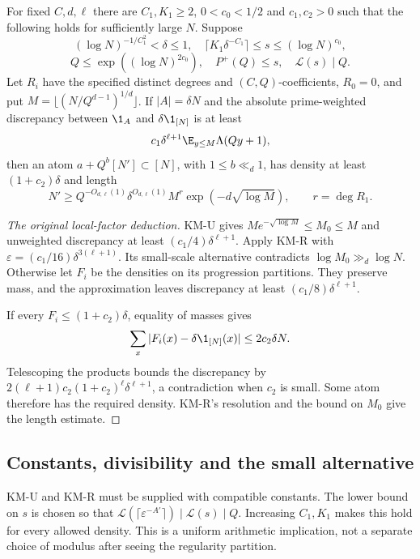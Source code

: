 \begin{proposition}\label{p:KMTT}
For fixed $C,d,\ell$ there are $C_1,K_1\geq2$, $0<c_0<1/2$ and $c_1,c_2>0$ such that the following holds for sufficiently large $N$. Suppose
\[
 (\log N)^{-1/C_1^2}<\delta\leq1,\quad
 \lceil K_1\delta^{-C_1}\rceil\leq s\leq(\log N)^{c_0},
\]
\[
 Q\leq\exp((\log N)^{2c_0}),\quad P^+(Q)\leq s,\quad \mathcal L(s)\mid Q.
\]
Let $R_i$ have the specified distinct degrees and $(C,Q)$-coefficients, $R_0=0$, and put $M=\lfloor(N/Q^{d-1})^{1/d}\rfloor$. If $|A|=\delta N$ and the absolute prime-weighted discrepancy between $\1_A$ and $\delta\1_{[N]}$ is at least
\[
 c_1\delta^{\ell+1}\E_{y\leq M}\Lambda(Qy+1),
\]
then an atom $a+Q^b[N']\subset[N]$, with $1\leq b\ll_d1$, has density at least $(1+c_2)\delta$ and length
\[
 N'\geq Q^{-O_{d,\ell}(1)}\delta^{O_{d,\ell}(1)}
 M^r\exp(-d\sqrt{\log M}),\qquad r=\deg R_1.
\]
\end{proposition}
\begin{proof}[The original local-factor deduction]
KM-U gives $M e^{-\sqrt{\log M}}\leq M_0\leq M$ and unweighted discrepancy at least $(c_1/4)\delta^{\ell+1}$. Apply KM-R with $\varepsilon=(c_1/16)\delta^{3(\ell+1)}$. Its small-scale alternative contradicts $\log M_0\gg_d\log N$. Otherwise let $F_i$ be the densities on its progression partitions. They preserve mass, and the approximation leaves discrepancy at least $(c_1/8)\delta^{\ell+1}$.

If every $F_i\leq(1+c_2)\delta$, equality of masses gives
\[
 \sum_x|F_i(x)-\delta\1_{[N]}(x)|\leq2c_2\delta N.
\]
Telescoping the products bounds the discrepancy by
$2(\ell+1)c_2(1+c_2)^\ell\delta^{\ell+1}$, a contradiction when $c_2$ is small. Some atom therefore has the required density. KM-R's resolution and the bound on $M_0$ give the length estimate.
\end{proof}
\ifDetailed
\subsection*{Constants, divisibility and the small alternative}
KM-U and KM-R must be supplied with compatible constants. The lower bound on $s$ is chosen so that $\mathcal L(\lceil\varepsilon^{-A'}\rceil)\mid\mathcal L(s)\mid Q$. Increasing $C_1,K_1$ makes this hold for every allowed density. This is a uniform arithmetic implication, not a separate choice of modulus after seeing the regularity partition.

